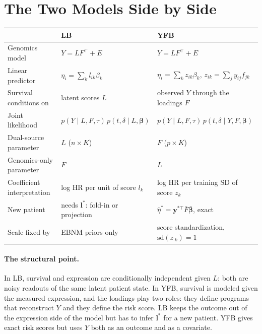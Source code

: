 \documentclass[11pt]{article}
\begin{document}
\section{The Two Models Side by Side}

\begin{center}
\begin{tabularx}{\textwidth}{>{\raggedright\arraybackslash}p{3.3cm}LL}
\toprule
 & LB & YFB \\
\midrule
Genomics model & $Y = LF^\top + E$ & $Y = LF^\top + E$ \\
Linear predictor & $\eta_i = \sum_k l_{ik}\beta_k$ & $\eta_i = \sum_k z_{ik}\beta_k$, $z_{ik} = \sum_j y_{ij}f_{jk}$ \\
Survival conditions on & latent scores $L$ & observed $Y$ through the loadings $F$ \\
Joint likelihood & $p(Y\mid L,F,\tau)\,p(t,\delta\mid L,\bm\beta)$ & $p(Y\mid L,F,\tau)\,p(t,\delta\mid Y,F,\bm\beta)$ \\
Dual-source parameter & $L$ ($n\times K$) & $F$ ($p\times K$) \\
Genomics-only parameter & $F$ & $L$ \\
Coefficient interpretation & log HR per unit of score $l_k$ & log HR per training SD of score $z_k$ \\
New patient & needs $\bm l^*$: fold-in or projection & $\hat\eta^* = \bm y^{*\top}\bar F\bar{\bm\beta}$, exact \\
Scale fixed by & EBNM priors only & score standardization, $\mathrm{sd}(z_{\cdot k}) = 1$ \\
\bottomrule
\end{tabularx}
\end{center}

\paragraph{The structural point.} In LB, survival and expression are
conditionally independent given $L$: both are noisy readouts of the same latent
patient state. In YFB, survival is modeled given the measured expression, and
the loadings play two roles: they define programs that reconstruct $Y$ and they
define the risk score. LB keeps the outcome out of the expression side of the
model but has to infer $\bm l^*$ for a new patient. YFB gives exact risk scores
but uses $Y$ both as an outcome and as a covariate.
\end{document}
